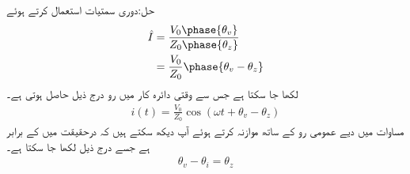 حل:دوری سمتیات استعمال کرتے ہوئے
\begin{align*}
\hat{I}&=\frac{V_0\phase{\theta_v}}{Z_0\phase{\theta_z}}\\
&=\frac{V_0}{Z_0}\phase{\theta_v-\theta_z}
\end{align*}
لکھا جا سکتا ہے جس سے وقتی دائرہ کار میں رو درج ذیل حاصل ہوتی ہے۔
\begin{align}
i(t)=\frac{V_0}{Z_0} \cos(\omega t+\theta_v-\theta_z)
\end{align}
مساوات  میں دیے عمومی رو کے ساتھ موازنہ کرتے ہوئے آپ دیکھ سکتے ہیں کہ  درحقیقت میں  کے برابر ہے  جسے درج ذیل لکھا جا سکتا ہے۔
\begin{align}\label{مساوات_طاقت_زاویہ_رکاوٹ_اور_طاقت}
\theta_v-\theta_i=\theta_z
\end{align}

